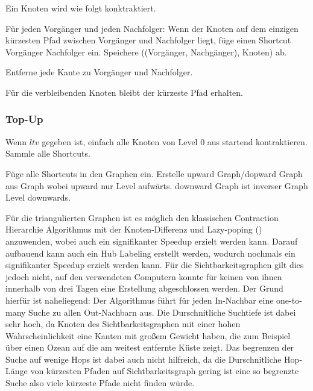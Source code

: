 \begin{definition}
    Ein Knoten wird wie folgt konktraktiert.

    Für jeden Vorgänger und jeden Nachfolger:
    Wenn der Knoten auf dem einzigen kürzesten Pfad zwischen Vorgänger und Nachfolger liegt, füge einen Shortcut Vorgänger Nachfolger ein.
    Speichere ((Vorgänger, Nachgänger), Knoten) ab.

    Entferne jede Kante zu Vorgänger und Nachfolger.
\end{definition}

Für die verbleibenden Knoten bleibt der kürzeste Pfad erhalten.


\subsubsection{Top-Up}

Wenn $ltv$ gegeben ist, einfach alle Knoten von Level 0 aus startend kontraktieren.
Sammle alle Shortcuts.

Füge alle Shortcuts in den Graphen ein.
Erstelle upward Graph/dopward Graph aus Graph wobei upward  nur Level aufwärts.
downward Graph ist inverser Graph Level downwards.



Für die triangulierten Graphen ist es möglich den klassischen Contraction Hierarchie Algorithmus mit der Knoten-Differenz und Lazy-poping (\cite{geisberger2008contraction}) anzuwenden, wobei auch ein signifikanter Speedup erzielt werden kann. 
Darauf aufbauend kann auch ein Hub Labeling erstellt werden, wodurch nochmals ein signifikanter Speedup erzielt werden kann.
Für die Sichtbarkeitsgraphen gilt dies jedoch nicht, auf den verwendeten Computern konnte für keinen von ihnen innerhalb von drei Tagen eine Erstellung abgeschlossen werden.
Der Grund hierfür ist naheliegend: Der Algorithmus führt für jeden In-Nachbar eine one-to-many Suche zu allen Out-Nachbarn aus.
Die Durschnitliche Suchtiefe ist dabei sehr hoch, da Knoten des Sichtbarkeitsgraphen mit einer hohen Wahrscheinlichkeit eine Kanten mit großem Gewicht haben, die zum Beispiel über einen Ozean auf die am weitest entfernte Küste zeigt.
Das begrenzen der Suche auf wenige Hops ist dabei auch nicht hilfreich, da die Durschnitliche Hop-Länge von kürzesten Pfaden auf Sichtbarkeitsgraph gering ist eine so begrenzte Suche also viele kürzeste Pfade nicht finden würde.

